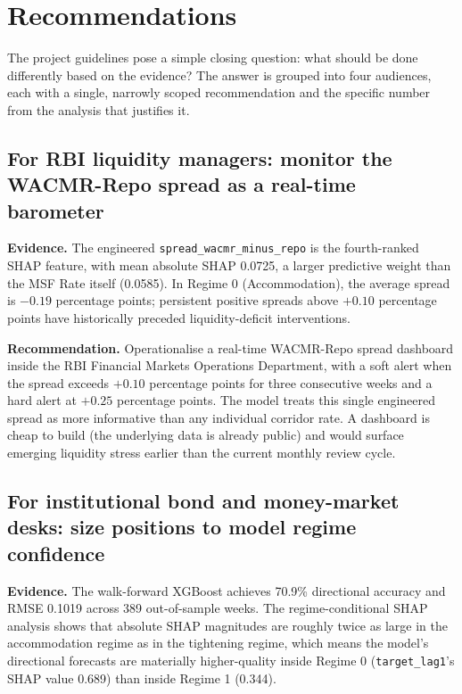\section{Recommendations}
\label{sec:recommendations}

The project guidelines pose a simple closing question: what should be
done differently based on the evidence? The answer is grouped into
four audiences, each with a single, narrowly scoped recommendation
and the specific number from the analysis that justifies it.

\subsection{For RBI liquidity managers: monitor the WACMR-Repo
spread as a real-time barometer}

\textbf{Evidence.} The engineered \texttt{spread\_wacmr\_minus\_repo}
is the fourth-ranked SHAP feature, with mean absolute SHAP 0.0725, a
larger predictive weight than the MSF Rate itself (0.0585). In
Regime 0 (Accommodation), the average spread is $-0.19$ percentage
points; persistent positive spreads above $+0.10$ percentage points
have historically preceded liquidity-deficit interventions.

\textbf{Recommendation.} Operationalise a real-time WACMR-Repo
spread dashboard inside the RBI Financial Markets Operations
Department, with a soft alert when the spread exceeds $+0.10$
percentage points for three consecutive weeks and a hard alert at
$+0.25$ percentage points. The model treats this single engineered
spread as more informative than any individual corridor rate. A
dashboard is cheap to build (the underlying data is already public)
and would surface emerging liquidity stress earlier than the current
monthly review cycle.

\subsection{For institutional bond and money-market desks: size
positions to model regime confidence}

\textbf{Evidence.} The walk-forward XGBoost achieves 70.9\%
directional accuracy and RMSE 0.1019 across 389 out-of-sample weeks.
The regime-conditional SHAP analysis shows that absolute SHAP
magnitudes are roughly twice as large in the accommodation regime as
in the tightening regime, which means the model's directional
forecasts are materially higher-quality inside Regime 0
(\texttt{target\_lag1}'s SHAP value 0.689) than inside Regime 1
(0.344).

